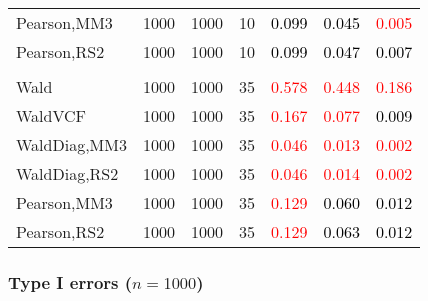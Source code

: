 \documentclass[
]{article}
\begin{document}
\begin{table}[H]
{\begin{tabular}[t]{lrrrrrr}
\hspace{1em}Pearson,MM3 & 1000 & 1000 & 10 & \textcolor{black}{0.099} & \textcolor{black}{0.045} & \textcolor{red}{0.005}\\
\hspace{1em}Pearson,RS2 & 1000 & 1000 & 10 & \textcolor{black}{0.099} & \textcolor{black}{0.047} & \textcolor{black}{0.007}\\
\addlinespace[0.3em]
\multicolumn{7}{l}{\textbf{3F 15V}}\\
\hspace{1em}Wald & 1000 & 1000 & 35 & \textcolor{red}{0.578} & \textcolor{red}{0.448} & \textcolor{red}{0.186}\\
\hspace{1em}WaldVCF & 1000 & 1000 & 35 & \textcolor{red}{0.167} & \textcolor{red}{0.077} & \textcolor{black}{0.009}\\
\hspace{1em}WaldDiag,MM3 & 1000 & 1000 & 35 & \textcolor{red}{0.046} & \textcolor{red}{0.013} & \textcolor{red}{0.002}\\
\hspace{1em}WaldDiag,RS2 & 1000 & 1000 & 35 & \textcolor{red}{0.046} & \textcolor{red}{0.014} & \textcolor{red}{0.002}\\
\hspace{1em}Pearson,MM3 & 1000 & 1000 & 35 & \textcolor{red}{0.129} & \textcolor{black}{0.060} & \textcolor{black}{0.012}\\
\hspace{1em}Pearson,RS2 & 1000 & 1000 & 35 & \textcolor{red}{0.129} & \textcolor{black}{0.063} & \textcolor{black}{0.012}\\
\bottomrule
\end{tabular}}
\endgroup{}
\end{table}

\hypertarget{type-i-errors-n1000-3}{%
\subsubsection{\texorpdfstring{Type I errors
(\(n=1000\))}{Type I errors (n=1000)}}\label{type-i-errors-n1000-3}}
\end{document}
